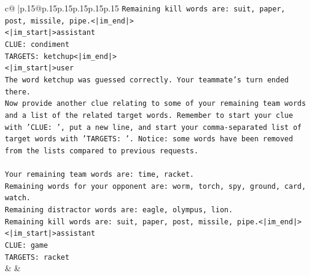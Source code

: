 \documentclass{article}
\begin{document}
{\begin{supertabular}{c@{$\;$}|p{.15\linewidth}@{}p{.15\linewidth}p{.15\linewidth}p{.15\linewidth}p{.15\linewidth}p{.15\linewidth}}
{{{\texttt{Remaining kill words are: suit, paper, post, missile, pipe.<|im\_end|>} \\
\texttt{<|im\_start|>assistant} \\
\texttt{CLUE: condiment} \\
\texttt{TARGETS: ketchup<|im\_end|>} \\
\texttt{<|im\_start|>user} \\
\texttt{The word ketchup was guessed correctly. Your teammate's turn ended there.} \\
\texttt{Now provide another clue relating to some of your remaining team words and a list of the related target words. Remember to start your clue with 'CLUE: ', put a new line, and start your comma{-}separated list of target words with 'TARGETS: '. Notice: some words have been removed from the lists compared to previous requests.} \\
\\ 
\texttt{Your remaining team words are: time, racket.} \\
\texttt{Remaining words for your opponent are: worm, torch, spy, ground, card, watch.} \\
\texttt{Remaining distractor words are: eagle, olympus, lion.} \\
\texttt{Remaining kill words are: suit, paper, post, missile, pipe.<|im\_end|>} \\
\texttt{<|im\_start|>assistant} \\
\texttt{CLUE: game} \\
\texttt{TARGETS: racket} \\
            }
        }
    }
    & & \\ \\


\end{supertabular}}
\end{document}
